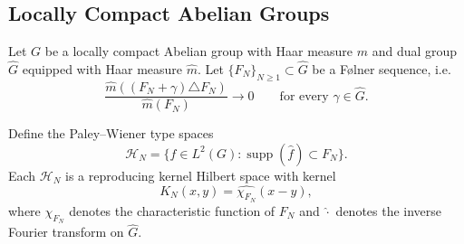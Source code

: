 \documentclass{amsart}
\newtheorem{cor}[thm]{Corollary}
\theoremstyle{definition}
\theoremstyle{remark}
\numberwithin{equation}{section}
\newcommand{\R}{\mathbb{R}} %
\begin{document}

\subsection{Locally Compact Abelian Groups}

Let $G$ be a locally compact Abelian group with Haar measure $m$ and dual group $\widehat{G}$ equipped with Haar measure $\widehat{m}$.  
Let $\{F_N\}_{N\ge1}\subset \widehat{G}$ be a F\o lner sequence, i.e.
\[
\frac{\widehat{m}((F_N+\gamma)\triangle F_N)}{\widehat{m}(F_N)}
\longrightarrow 0
\qquad \text{for every } \gamma\in\widehat{G}.
\]

Define the Paley–Wiener type spaces
\[
\mathcal{H}_N
=
\{f\in L^2(G): \operatorname{supp}(\widehat{f})\subset F_N\}.
\]
Each $\mathcal{H}_N$ is a reproducing kernel Hilbert space with kernel
\[
K_N(x,y)
=
\widehat{\chi_{F_N}}(x-y),
\]
where $\chi_{F_N}$ denotes the characteristic function of $F_N$ and $\widehat{\cdot}$ denotes the inverse Fourier transform on $\widehat{G}$.
\end{document}
